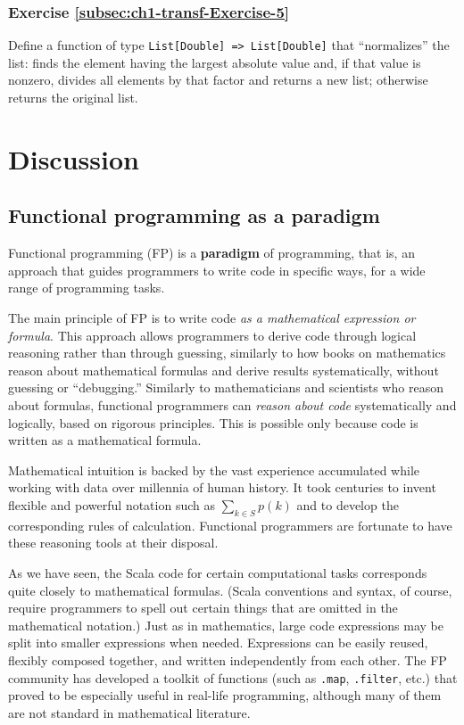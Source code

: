 \subsubsection{Exercise \label{subsec:ch1-transf-Exercise-5}\ref{subsec:ch1-transf-Exercise-5}}

Define a function of type \texttt{}\lstinline!List[Double] => List[Double]!
that ``normalizes'' the list: finds the element having the largest
absolute value and, if that value is nonzero, divides all elements
by that factor and returns a new list; otherwise returns the original
list.

\section{Discussion}

\subsection{Functional programming as a paradigm}

Functional programming (FP) is a \textbf{paradigm}
of programming, \textendash{} that is, an approach that guides programmers
to write code in specific ways, for a wide range of programming tasks.

The main principle of FP is to write code \emph{as a mathematical
expression or formula}. This approach allows programmers to derive
code through logical reasoning rather than through guessing, \textendash{}
similarly to how books on mathematics reason about mathematical formulas
and derive results systematically, without guessing or ``debugging.''
Similarly to mathematicians and scientists who reason about formulas,
functional programmers can \emph{reason about code} systematically
and logically, based on rigorous principles. This is possible only
because code is written as a mathematical formula.

Mathematical intuition is backed by the vast experience accumulated
while working with data over millennia of human history. It took centuries
to invent flexible and powerful notation such as $\sum_{k\in S}p(k)$
and to develop the corresponding rules of calculation. Functional
programmers are fortunate to have these reasoning tools at their disposal.

As we have seen, the Scala code for certain computational tasks corresponds
quite closely to mathematical formulas. (Scala conventions and syntax,
of course, require programmers to spell out certain things that are
omitted in the mathematical notation.) Just as in mathematics, large
code expressions may be split into smaller expressions when needed.
Expressions can be easily reused, flexibly composed together, and
written independently from each other. The FP community has developed
a toolkit of functions (such as \lstinline!.map!, \texttt{}\lstinline!.filter!,
etc.) that proved to be especially useful in real-life programming,
although many of them are not standard in mathematical literature.

